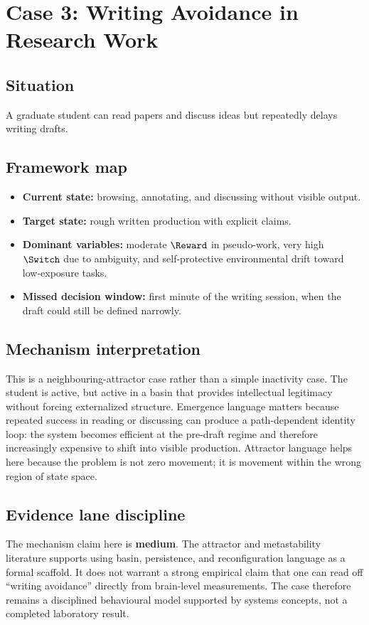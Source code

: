 \section{Case 3: Writing Avoidance in Research Work}

\subsection*{Situation}
A graduate student can read papers and discuss ideas but repeatedly delays
writing drafts.

\subsection*{Framework map}
\begin{itemize}[nosep]
  \item \textbf{Current state:} browsing, annotating, and discussing without
        visible output.
  \item \textbf{Target state:} rough written production with explicit claims.
  \item \textbf{Dominant variables:} moderate $\Reward$ in pseudo-work, very
        high $\Switch$ due to ambiguity, and self-protective environmental
        drift toward low-exposure tasks.
  \item \textbf{Missed decision window:} first minute of the writing session,
        when the draft could still be defined narrowly.
\end{itemize}

\subsection*{Mechanism interpretation}
This is a neighbouring-attractor case rather than a simple inactivity case.
The student is active, but active in a basin that provides intellectual
legitimacy without forcing externalized structure. Emergence language matters
because repeated success in reading or discussing can produce a path-dependent
identity loop: the system becomes efficient at the pre-draft regime and
therefore increasingly expensive to shift into visible production. Attractor
language helps here because the problem is not zero movement; it is movement
within the wrong region of state space.

\subsection*{Evidence lane discipline}
The mechanism claim here is \textbf{medium}. The attractor and metastability
literature supports using basin, persistence, and reconfiguration language as a
formal scaffold. It does not warrant a strong empirical claim that one can read
off ``writing avoidance'' directly from brain-level measurements. The case
therefore remains a disciplined behavioural model supported by systems
concepts, not a completed laboratory result.

